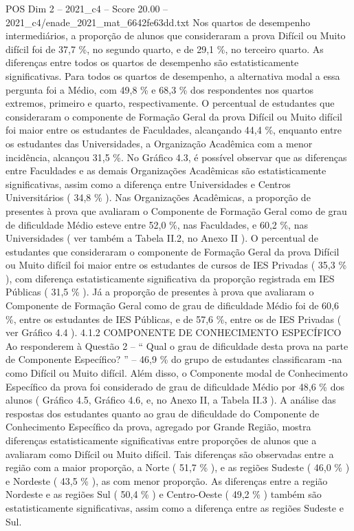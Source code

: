 \begin{textsample}{POS Dim 2 – 2021\_c4 – Score 20.00 – 2021\_c4/enade\_2021\_mat\_6642fe63dd.txt}
Nos quartos de desempenho intermediários, a proporção de alunos que consideraram a prova Difícil ou Muito difícil foi de 37,7 \%, no segundo quarto, e de 29,1 \%, no terceiro quarto.
As diferenças entre todos os quartos de desempenho são estatisticamente significativas.
Para todos os quartos de desempenho, a alternativa modal a essa pergunta foi a Médio, com 49,8 \% e 68,3 \% dos respondentes nos quartos extremos, primeiro e quarto, respectivamente.
O percentual de estudantes que consideraram o componente de Formação Geral da prova Difícil ou Muito difícil foi maior entre os estudantes de Faculdades, alcançando 44,4 \%, enquanto entre os estudantes das Universidades, a Organização Acadêmica com a menor incidência, alcançou 31,5 \%.
No Gráfico 4.3, é possível observar que as diferenças entre Faculdades e as demais Organizações Acadêmicas são estatisticamente significativas, assim como a diferença entre Universidades e Centros Universitários ( 34,8 \% ).
Nas Organizações Acadêmicas, a proporção de presentes à prova que avaliaram o Componente de Formação Geral como de grau de dificuldade Médio esteve entre 52,0 \%, nas Faculdades, e 60,2 \%, nas Universidades ( ver também a Tabela II.2, no Anexo II ).
O percentual de estudantes que consideraram o componente de Formação Geral da prova Difícil ou Muito difícil foi maior entre os estudantes de cursos de IES Privadas ( 35,3 \% ), com diferença estatisticamente significativa da proporção registrada em IES Públicas ( 31,5 \% ).
Já a proporção de presentes à prova que avaliaram o Componente de Formação Geral como de grau de dificuldade Médio foi de 60,6 \%, entre os estudantes de IES Públicas, e de 57,6 \%, entre os de IES Privadas ( ver Gráfico 4.4 ). 4.1.2 COMPONENTE DE CONHECIMENTO ESPECÍFICO Ao responderem à Questão 2 – “ Qual o grau de dificuldade desta prova na parte de Componente Específico? ” – 46,9 \% do grupo de estudantes classificaram -na como Difícil ou Muito difícil.
Além disso, o Componente modal de Conhecimento Específico da prova foi considerado de grau de dificuldade Médio por 48,6 \% dos alunos ( Gráfico 4.5, Gráfico 4.6, e, no Anexo II, a Tabela II.3 ).
A análise das respostas dos estudantes quanto ao grau de dificuldade do Componente de Conhecimento Específico da prova, agregado por Grande Região, mostra diferenças estatisticamente significativas entre proporções de alunos que a avaliaram como Difícil ou Muito difícil.
Tais diferenças são observadas entre a região com a maior proporção, a Norte ( 51,7 \% ), e as regiões Sudeste ( 46,0 \% ) e Nordeste ( 43,5 \% ), as com menor proporção.
As diferenças entre a região Nordeste e as regiões Sul ( 50,4 \% ) e Centro-Oeste ( 49,2 \% ) também são estatisticamente significativas, assim como a diferença entre as regiões Sudeste e Sul.

\end{textsample}
